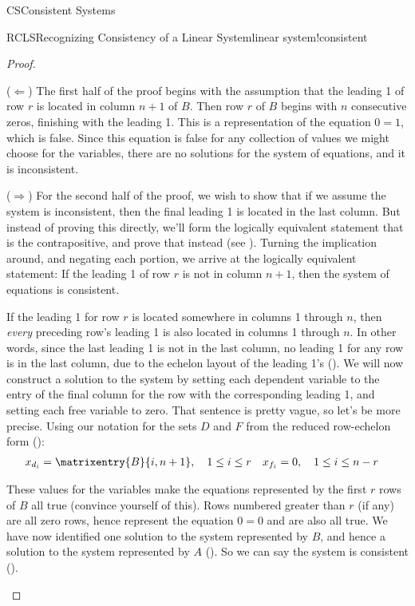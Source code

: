 \begin{subsect}{CS}{Consistent Systems}
\begin{theorem}{RCLS}{Recognizing Consistency of a Linear System}{linear system!consistent}
\end{theorem}
%
\begin{proof}
\begin{para}($\Leftarrow$)  The first half of the proof begins with the assumption that the leading 1 of row $r$ is located in column $n+1$ of $B$.  Then row $r$ of $B$ begins with $n$ consecutive zeros, finishing with the leading 1.  This is a representation of the equation $0=1$, which is false.  Since this equation is false for any collection of values we might choose for the variables, there are no solutions for the system of equations, and it is inconsistent.\end{para}
%
\begin{para}($\Rightarrow$)  For the second half of the proof, we wish to show that if we assume the system is inconsistent, then the final leading 1 is located in the last column.  But instead of proving this directly, we'll form the logically equivalent statement that is the contrapositive, and prove that instead (see ).  Turning the implication around, and negating each portion, we arrive at the logically equivalent statement:  If the leading 1 of row $r$ is not in column $n+1$, then the system of equations is consistent.\end{para}
%
\begin{para}If the  leading 1 for row $r$ is located somewhere in columns 1 through $n$, then {\em every} preceding row's leading 1 is also located in columns 1 through $n$.  In other words, since the last leading 1 is not in the last column, no leading 1 for any row is in the last column, due to the echelon layout of the leading 1's ().  We will now construct a solution to the system by setting each dependent variable to the entry of the final column for the row with the corresponding leading 1, and setting each free variable to zero.  That sentence is pretty vague, so let's be more precise.  Using our notation for the sets $D$ and $F$ from the reduced row-echelon form ():
%
\begin{align*}
x_{d_i}&=\matrixentry{B}{i,n+1},\quad 1\leq i\leq r
&
x_{f_i}&=0,\quad 1\leq i\leq n-r
\end{align*}
\end{para}
%
\begin{para}These values for the variables make the equations represented by the first $r$ rows of $B$ all true (convince yourself of this).  Rows numbered greater than $r$ (if any) are all zero rows, hence represent the equation $0=0$ and are also all true.  We have now identified one solution to the system represented by $B$, and hence a solution to the system represented by $A$ ().  So we can say the system is consistent ().

\end{para}
\end{proof}
\end{subsect}
